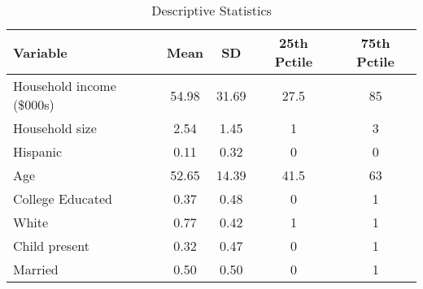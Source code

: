 \begin{table}[!htbp] \centering
  \caption{Descriptive Statistics}
  \label{tab:homescanSummaryStats}
\begin{tabular}{lcccc}
\hline
Variable                  & Mean  & SD    & 25th Pctile & 75th Pctile\\
\hline
Household income (\$000s) & 54.98 & 31.69 & 27.5        & 85 \\
Household size            & 2.54  & 1.45  & 1           & 3 \\
Hispanic                  & 0.11  & 0.32  & 0           & 0 \\
Age                       & 52.65 & 14.39 & 41.5        & 63 \\
College Educated          & 0.37  & 0.48  & 0           & 1 \\
White                     & 0.77  & 0.42  & 1           & 1\\
Child present             & 0.32  & 0.47  & 0           & 1\\
Married                   & 0.50  & 0.50  & 0           & 1\\
\hline
\hline
\end{tabular}
\end{table}
